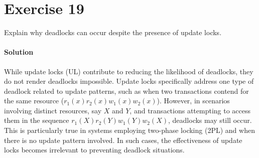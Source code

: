 \section{Exercise 19}

Explain why deadlocks can occur despite the presence of update locks. 

\paragraph*{Solution}
While update locks (UL) contribute to reducing the likelihood of deadlocks, they do not render deadlocks impossible.
Update locks specifically address one type of deadlock related to update patterns, such as when two transactions contend for the same resource ($r_1(x) r_2(x) w_1(x) w_2(x)$). 
However, in scenarios involving distinct resources, say $X$ and $Y$, and transactions attempting to access them in the sequence $r_1(X) r_2(Y) w_1(Y) w_2(X)$, deadlocks may still occur.
This is particularly true in systems employing two-phase locking (2PL) and when there is no update pattern involved.
In such cases, the effectiveness of update locks becomes irrelevant to preventing deadlock situations.